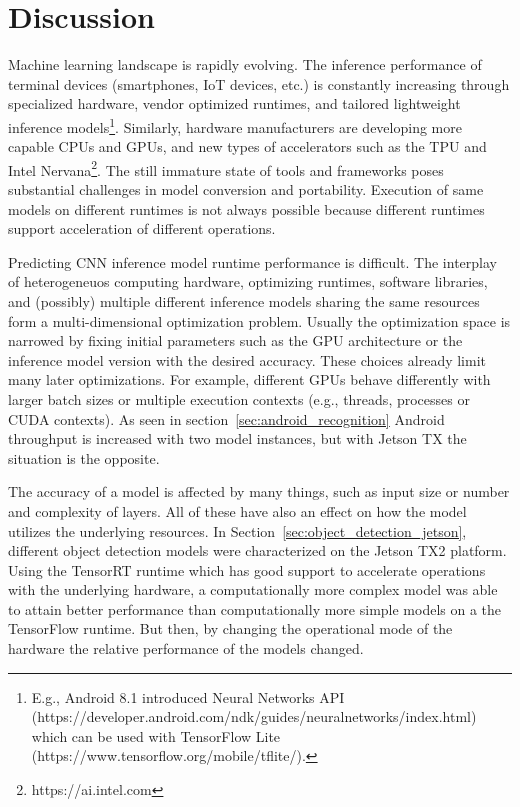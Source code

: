 \documentclass[sigconf]{acmart}
\begin{document}
\section{Discussion}\label{sec:discussion}

Machine learning landscape is rapidly evolving. The inference performance of terminal devices (smartphones, IoT devices, etc.) is constantly increasing through specialized hardware, vendor optimized runtimes, and tailored lightweight inference models\footnote{E.g., Android 8.1 introduced Neural Networks API (https://developer.android.com/ndk/guides/neuralnetworks/index.html) which can be used with TensorFlow Lite (https://www.tensorflow.org/mobile/tflite/).}. Similarly, hardware manufacturers are developing more capable CPUs and GPUs, and new types of accelerators such as the TPU and Intel Nervana\footnote{https://ai.intel.com}. 
The still immature state of tools and frameworks poses substantial challenges in model conversion and portability. Execution of same models on different runtimes is not always possible because different runtimes support acceleration of different operations. 

Predicting CNN inference model runtime performance is difficult. The interplay of heterogeneuos computing hardware, optimizing runtimes, software libraries, and (possibly) multiple different inference models sharing the same resources form a multi-dimensional optimization problem.
Usually the optimization space is narrowed by fixing initial parameters such as the GPU architecture or the inference model version with the desired accuracy. These choices already limit many later optimizations. For example, different GPUs behave differently with larger batch sizes or multiple execution contexts (e.g., threads, processes or CUDA contexts). As seen in section~\ref{sec:android_recognition}
Android throughput is increased with two model instances, but with Jetson TX the situation is the opposite.

The accuracy of a model is affected by many things, such as input size or number and complexity of layers. All of these have also an effect on how the model utilizes the underlying resources. In Section~\ref{sec:object_detection_jetson}, different object detection models were characterized on the Jetson TX2 platform. Using the TensorRT runtime which has good support to accelerate operations with the underlying hardware, a computationally more complex model was able to attain better performance than computationally more simple models on a the TensorFlow runtime. But then, by changing the operational mode of the hardware the relative performance of the models changed.
\end{document}
